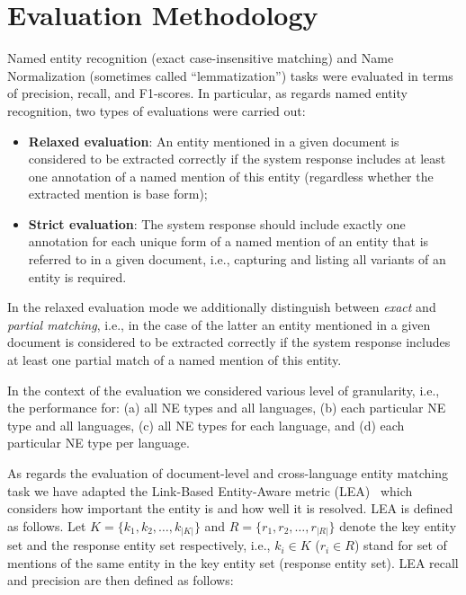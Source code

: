 \documentclass[11pt]{article}
\begin{document}
\begin{table*}[t]
\begin{minipage}{\linewidth}
  \end{minipage}%
\end{table*}



\section{Evaluation Methodology}
\label{sec:evaluation}

Named entity recognition (exact case-insensitive matching) and  Name Normalization (sometimes called “lemmatization”) tasks were evaluated in terms of precision, recall, and F1-scores. In particular, as regards named entity recognition, two types of evaluations were carried out:

\begin{itemize}

\item \textbf{Relaxed evaluation}: An entity mentioned in a given document is considered to be extracted correctly if the system response includes at least one annotation of a named mention of this entity (regardless whether the extracted mention is base form);

\item \textbf{Strict evaluation}: The system response should include exactly one annotation for each unique form of a named mention of an entity that is referred to in a given document, i.e., capturing and listing all variants of an entity is required.

\end{itemize}

\noindent In the relaxed evaluation mode we additionally distinguish between \textit{exact} and \textit{partial matching}, i.e., in the case of the latter an entity mentioned in a given document is considered to be extracted correctly if the system response includes at least one partial match of a named mention of this entity.

In the context of the evaluation we considered various level of granularity, i.e., the performance for: 
(a) all NE types and all languages, (b) each particular NE type and all languages, (c) all NE types for 
each language, and (d) each particular NE type per language. 


As regards the evaluation of document-level and cross-language entity matching task we have adapted the 
Link-Based Entity-Aware metric (LEA)~\cite{DBLP:conf-acl-Moosavi016} which considers how important the entity is and how well it is resolved. LEA is defined as follows. Let $K = \{k_1,k_2,\ldots,k_{|K|} \}$ and $R = \{r_1,r_2,\ldots,r_{|R|} \}$ denote the key entity set and the response entity set respectively, i.e., $k_i \in K$ ($r_i \in R$) stand for set of mentions
of the same entity in the key entity set (response entity set). LEA recall and precision are then defined as follows:
\end{document}
